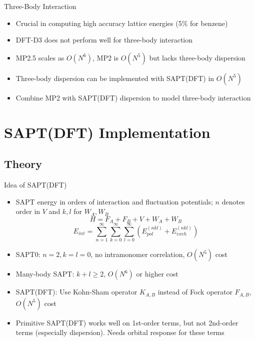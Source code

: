 \documentclass{beamer}
\begin{document}
    \begin{frame}{Three-Body Interaction}
        \begin{itemize}
            \item Crucial in computing high accuracy lattice energies (5\% for benzene)
            \item DFT-D3 does not perform well for three-body interaction
            \item MP2.5 scales as $O(N^6)$, MP2 is $O(N^5)$ but lacks three-body dispersion
            \item Three-body dispersion can be implemented with SAPT(DFT) in $O(N^5)$
            \item Combine MP2 with SAPT(DFT) dispersion to model three-body interaction  
        \end{itemize}   
    \end{frame}

\section{SAPT(DFT) Implementation}
    
    \subsection{Theory}
             
        \begin{frame}{Idea of SAPT(DFT)}
            \begin{itemize}
                \item SAPT energy in orders of interaction and fluctuation potentials; $n$ denotes order in $V$ and $k,l$ for $W_A, W_B$
                $$H = F_A + F_B + V + W_A + W_B$$
                $$E_{int} = \sum_{n=1}^\infty \sum_{k=0}^\infty \sum_{l=0}^\infty \left(E_{pol}^{(nkl)} + E_{exch}^{(nkl)}\right)$$
                \item SAPT0: $n = 2, k = l = 0$, no intramonomer correlation, $O(N^5)$ cost
                \item Many-body SAPT: $k+l \geq 2$, $O(N^6)$ or higher cost
                \item SAPT(DFT): Use Kohn-Sham operator $K_{A,B}$ instead of Fock operator $F_{A,B}$, $O(N^5)$ cost
                \item Primitive SAPT(DFT) works well on 1st-order terms, but not 2nd-order terms (especially dispersion). Needs orbital response for these terms
            \end{itemize}
        \end{frame}
\end{document}
